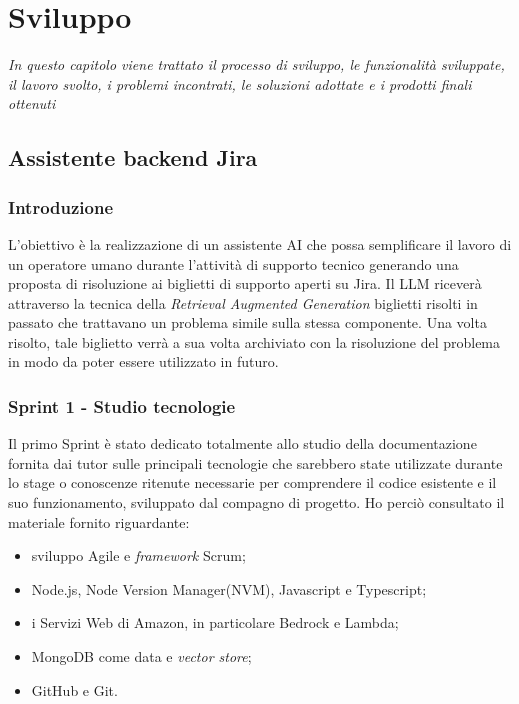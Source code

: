 \chapter{Sviluppo}
\label{chap:development}

\textit{In questo capitolo viene trattato il processo di sviluppo, le funzionalità sviluppate, il lavoro svolto, i problemi incontrati, le soluzioni adottate e i prodotti finali ottenuti}

\section{Assistente backend Jira}

\subsection{Introduzione}
L'obiettivo è la realizzazione di un assistente AI che possa semplificare il lavoro di un operatore umano durante l'attività di supporto tecnico generando una proposta di risoluzione ai biglietti di supporto aperti su Jira. Il LLM riceverà attraverso la tecnica della \textit{Retrieval Augmented Generation} biglietti risolti in passato che trattavano un problema simile sulla stessa componente. Una volta risolto, tale biglietto verrà a sua volta archiviato con la risoluzione del problema in modo da poter essere utilizzato in futuro.  

\subsection{Sprint 1 - Studio tecnologie}
Il primo Sprint è stato dedicato totalmente allo studio della documentazione fornita dai tutor sulle principali tecnologie che sarebbero state utilizzate durante lo stage o conoscenze ritenute necessarie per comprendere il codice esistente e il suo funzionamento, sviluppato dal compagno di progetto.
Ho perciò consultato il materiale fornito riguardante:
\begin{itemize}
    \item sviluppo Agile e \textit{framework} Scrum;
    \item Node.js, Node Version Manager(NVM), Javascript e Typescript;
    \item i Servizi Web di Amazon, in particolare Bedrock e Lambda;
    \item MongoDB come data e \textit{vector store};
    \item GitHub e Git.
\end{itemize}

